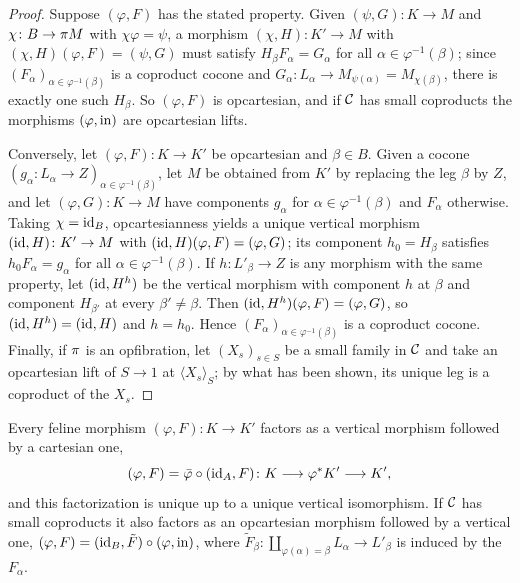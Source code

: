 \begin{proof}
Suppose $(\varphi,F)$ has the stated property. Given $(\psi,G)\colon K\to M$
and $\chi\colon B\to\pi M$ with $\chi\varphi=\psi$, a morphism
$(\chi,H)\colon K'\to M$ with $(\chi,H)(\varphi,F)=(\psi,G)$ must satisfy
$H_\beta F_\alpha=G_\alpha$ for all $\alpha\in\varphi^{-1}(\beta)$; since
$(F_\alpha)_{\alpha\in\varphi^{-1}(\beta)}$ is a coproduct cocone and
$G_\alpha\colon L_\alpha\to M_{\psi(\alpha)}=M_{\chi(\beta)}$, there is exactly
one such $H_\beta$. So $(\varphi,F)$ is opcartesian, and if $\mathcal{C}$ has small
coproducts the morphisms $(\varphi,\mathrm{in})$ are opcartesian lifts.

Conversely, let $(\varphi,F)\colon K\to K'$ be opcartesian and $\beta\in B$.
Given a cocone $(g_\alpha\colon L_\alpha\to Z)_{\alpha\in\varphi^{-1}(\beta)}$,
let $M$ be obtained from $K'$ by replacing the leg $\beta$ by $Z$, and let
$(\varphi,G)\colon K\to M$ have components $g_\alpha$ for
$\alpha\in\varphi^{-1}(\beta)$ and $F_\alpha$ otherwise. Taking $\chi=\mathrm{id}_B$,
opcartesianness yields a unique vertical morphism $(\mathrm{id},H)\colon K'\to M$ with
$(\mathrm{id},H)(\varphi,F)=(\varphi,G)$; its component $h_0=H_\beta$ satisfies
$h_0F_\alpha=g_\alpha$ for all $\alpha\in\varphi^{-1}(\beta)$. If
$h\colon L'_\beta\to Z$ is any morphism with the same property, let $(\mathrm{id},H^h)$
be the vertical morphism with component $h$ at $\beta$ and component $H_{\beta'}$
at every $\beta'\neq\beta$. Then $(\mathrm{id},H^h)(\varphi,F)=(\varphi,G)$, so
$(\mathrm{id},H^h)=(\mathrm{id},H)$ and $h=h_0$. Hence $(F_\alpha)_{\alpha\in\varphi^{-1}(\beta)}$
is a coproduct cocone. Finally, if $\pi$ is an opfibration, let $(X_s)_{s\in S}$
be a small family in $\mathcal{C}$ and take an opcartesian lift of $S\to1$ at
$\langle X_s\rangle_S$; by what has been shown, its unique leg is a coproduct of
the $X_s$.
\end{proof}

\begin{proposition}[Factorizations]\label{prop:factorization}
Every feline morphism $(\varphi,F)\colon K\to K'$ factors as a vertical morphism
followed by a cartesian one,
\[
(\varphi,F)=\bar\varphi\circ(\mathrm{id}_A,F)\colon K\longrightarrow\varphi^*K'\longrightarrow K',
\]
and this factorization is unique up to a unique vertical isomorphism. If $\mathcal{C}$
has small coproducts it also factors as an opcartesian morphism followed by a
vertical one, $(\varphi,F)=(\mathrm{id}_B,\tilde F)\circ(\varphi,\mathrm{in})$, where
$\tilde F_\beta\colon\coprod_{\varphi(\alpha)=\beta}L_\alpha\to L'_\beta$ is induced by
the $F_\alpha$.
\end{proposition}

